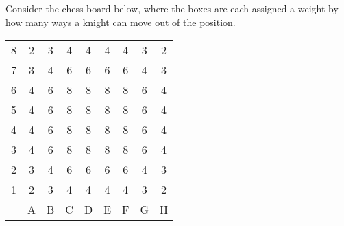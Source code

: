 \documentclass[10pt,a4paper]{exam}
\begin{document}
\begin{questions}
\begin{solution}
Consider the chess board below, where the boxes are each assigned a weight by how many ways a knight can move out of the position.
\begin{center}
\begin{tabular}{rcccccccc}
\cline{2-9}
\multicolumn{1}{r|}{8} & \multicolumn{1}{c|}{2} & \multicolumn{1}{c|}{3} & \multicolumn{1}{c|}{4} & \multicolumn{1}{c|}{4} & \multicolumn{1}{c|}{4} & \multicolumn{1}{c|}{4} & \multicolumn{1}{c|}{3} & \multicolumn{1}{c|}{2} \\ \cline{2-9} 
\multicolumn{1}{r|}{7} & \multicolumn{1}{c|}{3} & \multicolumn{1}{c|}{4} & \multicolumn{1}{c|}{6} & \multicolumn{1}{c|}{6} & \multicolumn{1}{c|}{6} & \multicolumn{1}{c|}{6} & \multicolumn{1}{c|}{4} & \multicolumn{1}{c|}{3} \\ \cline{2-9} 
\multicolumn{1}{r|}{6} & \multicolumn{1}{c|}{4} & \multicolumn{1}{c|}{6} & \multicolumn{1}{c|}{8} & \multicolumn{1}{c|}{8} & \multicolumn{1}{c|}{8} & \multicolumn{1}{c|}{8} & \multicolumn{1}{c|}{6} & \multicolumn{1}{c|}{4} \\ \cline{2-9} 
\multicolumn{1}{r|}{5} & \multicolumn{1}{c|}{4} & \multicolumn{1}{c|}{6} & \multicolumn{1}{c|}{8} & \multicolumn{1}{c|}{8} & \multicolumn{1}{c|}{8} & \multicolumn{1}{c|}{8} & \multicolumn{1}{c|}{6} & \multicolumn{1}{c|}{4} \\ \cline{2-9} 
\multicolumn{1}{r|}{4} & \multicolumn{1}{c|}{4} & \multicolumn{1}{c|}{6} & \multicolumn{1}{c|}{8} & \multicolumn{1}{c|}{8} & \multicolumn{1}{c|}{8} & \multicolumn{1}{c|}{8} & \multicolumn{1}{c|}{6} & \multicolumn{1}{c|}{4} \\ \cline{2-9} 
\multicolumn{1}{r|}{3} & \multicolumn{1}{c|}{4} & \multicolumn{1}{c|}{6} & \multicolumn{1}{c|}{8} & \multicolumn{1}{c|}{8} & \multicolumn{1}{c|}{8} & \multicolumn{1}{c|}{8} & \multicolumn{1}{c|}{6} & \multicolumn{1}{c|}{4} \\ \cline{2-9} 
\multicolumn{1}{r|}{2} & \multicolumn{1}{c|}{3} & \multicolumn{1}{c|}{4} & \multicolumn{1}{c|}{6} & \multicolumn{1}{c|}{6} & \multicolumn{1}{c|}{6} & \multicolumn{1}{c|}{6} & \multicolumn{1}{c|}{4} & \multicolumn{1}{c|}{3} \\ \cline{2-9} 
\multicolumn{1}{r|}{1} & \multicolumn{1}{c|}{2} & \multicolumn{1}{c|}{3} & \multicolumn{1}{c|}{4} & \multicolumn{1}{c|}{4} & \multicolumn{1}{c|}{4} & \multicolumn{1}{c|}{4} & \multicolumn{1}{c|}{3} & \multicolumn{1}{c|}{2} \\ \cline{2-9} 
                       & A                      & B                      & C                      & D                      & E                      & F                      & G                      & H                     
\end{tabular}
\end{center}


\end{solution}
\end{questions}
\end{document}
